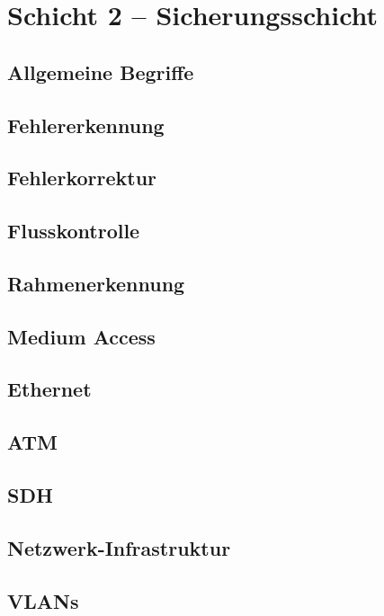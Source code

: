 \documentclass[a4paper,10pt]{scrartcl}
\begin{document}
\section{Schicht 2 -- Sicherungsschicht}
\subsection{Allgemeine Begriffe}
\subsection{Fehlererkennung}
\subsection{Fehlerkorrektur}
\subsection{Flusskontrolle}
\subsection{Rahmenerkennung}
\subsection{Medium Access}
\subsection{Ethernet}
\subsection{ATM}
\subsection{SDH}
\subsection{Netzwerk-Infrastruktur}
\subsection{VLANs}
\end{document}
